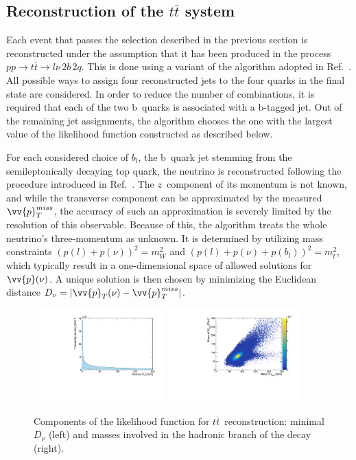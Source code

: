 \subsection{Reconstruction of the $t\bar t$ system}\label{subsec:ttbar_reco}
%
Each event that passes the selection described in the previous section is reconstructed under the assumption that it has been produced in the process $pp \rightarrow t\bar t \rightarrow l\nu\,2b\,2q$.
This is done using a variant of the algorithm adopted in Ref.~\cite{Khachatryan:2016mnb}.
All possible ways to assign four reconstructed jets to the four quarks in the final state are considered.
In order to reduce the number of combinations, it is required that each of the two b~quarks is associated with a b-tagged jet.
Out of the remaining jet assignments, the algorithm chooses the one with the largest value of the likelihood function constructed as described below.

For each considered choice of $b_{l}$, the b~quark jet stemming from the semileptonically decaying top quark, the neutrino is reconstructed following the procedure introduced in Ref.~\cite{Betchart:2013nba}.
The $z$~component of its momentum is not known, and while the transverse component can be approximated by the measured $\vv{p}_{T}^{miss}$, the accuracy of such an approximation is severely limited by the resolution of this observable.
Because of this, the algorithm treats the whole neutrino's three-momentum as unknown.
It is determined by utilizing mass constraints $(p(l) + p(\nu))^2 = m_{W}^2$ and $(p(l) + p(\nu) + p(b_{l}))^2 = m_{t}^2$, which typically result in a one-dimensional space of allowed solutions for $\vv{p}(\nu)$.
A unique solution is then chosen by minimizing the Euclidean distance $D_\nu = |\vv{p}_{T}(\nu) - \vv{p}_{T}^{miss}|$.

\begin{figure}
  \centering
  \includegraphics[width=0.45\textwidth]{fig/chapt5/Dnu.pdf}
  \includegraphics[width=0.45\textwidth]{fig/chapt5/M3.pdf}
  \caption{Components of the likelihood function for $t\bar t$~reconstruction: minimal $D_{\nu}$ (left) and masses involved in the hadronic branch of the decay (right).}
  \label{Fig:TTRecoLikelihood}
\end{figure}

